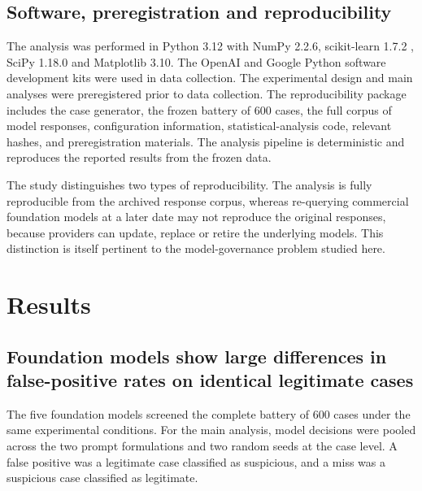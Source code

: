 \documentclass[pdflatex,sn-basic,Numbered]{sn-jnl}
\begin{document}
\subsection{Software, preregistration and reproducibility}

The analysis was performed in Python 3.12 with NumPy 2.2.6, scikit-learn 1.7.2 \cite{sklearn}, SciPy 1.18.0 and Matplotlib 3.10. The OpenAI and Google Python software development kits were used in data collection. The experimental design and main analyses were preregistered prior to data collection. The reproducibility package includes the case generator, the frozen battery of 600 cases, the full corpus of model responses, configuration information, statistical-analysis code, relevant hashes, and preregistration materials. The analysis pipeline is deterministic and reproduces the reported results from the frozen data.

The study distinguishes two types of reproducibility. The analysis is fully reproducible from the archived response corpus, whereas re-querying commercial foundation models at a later date may not reproduce the original responses, because providers can update, replace or retire the underlying models. This distinction is itself pertinent to the model-governance problem studied here.

\section{Results}\label{sec:results}

\subsection{Foundation models show large differences in false-positive rates on identical legitimate cases}\label{sec:fpspread}

The five foundation models screened the complete battery of 600 cases under the same experimental conditions. For the main analysis, model decisions were pooled across the two prompt formulations and two random seeds at the case level. A false positive was a legitimate case classified as suspicious, and a miss was a suspicious case classified as legitimate.
\end{document}
